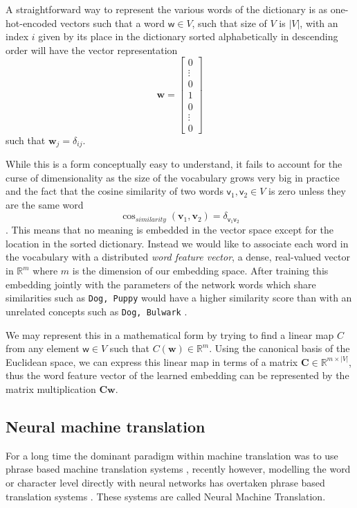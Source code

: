 A straightforward way to represent the various words of the dictionary is as
one-hot-encoded vectors such that a word $\mathsf{w} \in V$, such that size of
$V$ is $|V|$, with an index $i$ given by its place in the dictionary sorted
alphabetically in descending order will have the vector representation
\begin{equation}
  \label{eq:one_hot_encoding}
  \bm{w} =
  \begin{bmatrix}
    0 \\
    \vdots \\
    0 \\
    1 \\
    0 \\
    \vdots \\
    0
  \end{bmatrix}
\end{equation} \cite[p.~6]{goldberg2015primer}
such that $\bm{w}_{j} = \delta_{ij}$.

While this is a form conceptually easy to understand, it fails to account for the
curse of dimensionality as the size of the vocabulary grows very big in practice
and the fact that the cosine similarity of two words $\mathsf{v}_1,
\mathsf{v}_2 \in V$ is zero unless they are the same word
\begin{equation}
  \label{eq:cosine_similarity}
  \cos_{similarity}(\bm{v}_1, \bm{v}_2) = \delta_{\mathsf{v}_1 \mathsf{v}_2}
\end{equation}. This means that no meaning is embedded in the vector space
except for the location in the sorted dictionary. Instead we would like to
associate each word in the vocabulary with a distributed \textit{word feature
  vector}, a dense, real-valued vector in $\mathbb{R}^m$ where $m$ is the
dimension of our embedding space. After training this embedding jointly with the
parameters of the network words which share similarities such as \texttt{Dog,
  Puppy} would have a higher similarity score than with an unrelated concepts such as
\texttt{Dog, Bulwark} \cite{Bengio:2003:NPL:944919.944966}.

We may represent this in a mathematical form by trying to find a linear map $C$
from any element $\mathsf{w} \in V$ such that $C(\mathbf{w}) \in \mathbb{R}^m$.
Using the canonical basis of the Euclidean space, we can express this
linear map in terms of a matrix $\bm{C} \in \mathbb{R}^{m \times |V|}$, thus the
word feature vector of the learned embedding can be represented by the matrix
multiplication $\bm{C}\bm{w}$.

\subsection{Neural machine translation}
For a long time the dominant paradigm within machine translation was to use
phrase based machine translation systems \cite{Koehn:2003:SPT:1073445.1073462,
  Koehn:2007:MOS:1557769.1557821}, recently however, modelling the word or
character level directly with neural networks has overtaken phrase based
translation systems \cite{wolk_neural-based_2015, wu_googles_2016}. These
systems are called Neural Machine Translation.

